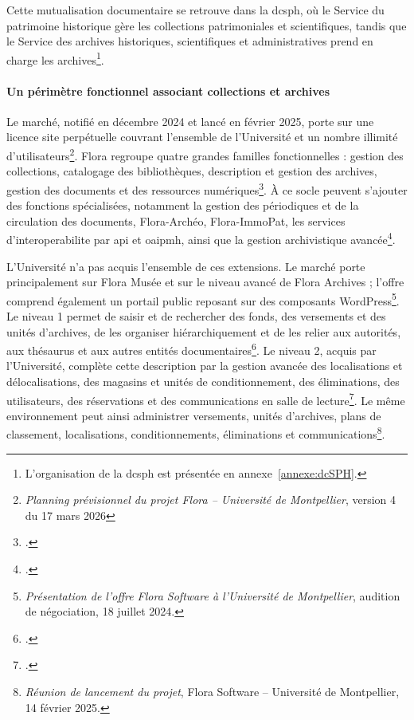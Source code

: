 Cette mutualisation documentaire se retrouve dans la \gls{dcsph}, où le Service du patrimoine historique gère les collections patrimoniales et scientifiques, tandis que le Service des archives historiques, scientifiques et administratives prend en charge les archives\footnote{L'organisation de la \gls{dcsph} est présentée en annexe~\ref{annexe:dcSPH}.}.

\paragraph{Un périmètre fonctionnel associant collections et archives}

Le marché, notifié en décembre 2024 et lancé en février 2025, porte sur une licence site perpétuelle couvrant l'ensemble de l'Université et un nombre illimité d'utilisateurs\footnote{\emph{Planning prévisionnel du projet Flora -- Université de Montpellier}, version 4 du 17 mars 2026}. Flora regroupe quatre grandes familles fonctionnelles : gestion des collections, catalogage des bibliothèques, description et gestion des archives, gestion des documents et des ressources numériques\footcite{FloraLogicielGestion}. À ce socle peuvent s'ajouter des fonctions spécialisées, notamment la gestion des périodiques et de la circulation des documents, Flora-Archéo, Flora-ImmoPat, les services d'\gls{interoperabilite} par \gls{api} et \gls{oaipmh}, ainsi que la gestion archivistique avancée\footcite{FloraProfilRCIP2025}.

L'Université n'a pas acquis l'ensemble de ces extensions. Le marché porte principalement sur Flora Musée et sur le niveau avancé de Flora Archives ; l'offre comprend également un portail public reposant sur des composants WordPress\footnote{\emph{Présentation de l'offre Flora Software à l'Université de Montpellier}, audition de négociation, 18 juillet 2024.}. Le niveau 1 permet de saisir et de rechercher des fonds, des versements et des unités d'archives, de les organiser hiérarchiquement et de les relier aux autorités, aux thésaurus et aux autres entités documentaires\footcite{FloraCatalogueFormations2024}. Le niveau 2, acquis par l'Université, complète cette description par la gestion avancée des localisations et délocalisations, des magasins et unités de conditionnement, des éliminations, des utilisateurs, des réservations et des communications en salle de lecture\footcite{FloraCatalogueFormations2024}. Le même environnement peut ainsi administrer versements, unités d'archives, plans de classement, localisations, conditionnements, éliminations et communications\footnote{\emph{Réunion de lancement du projet}, Flora Software -- Université de Montpellier, 14 février 2025.}.

